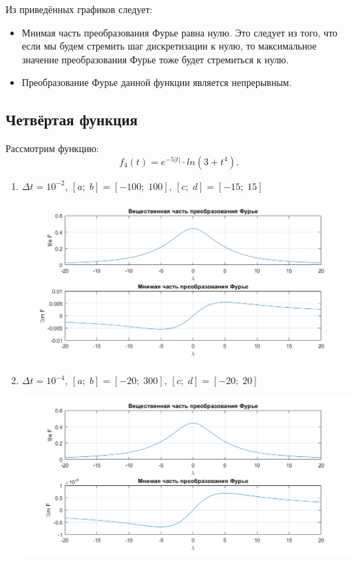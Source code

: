 \documentclass[a4paper, 11pt]{article}
\begin{document}
        Из приведённых графиков следует:
        \begin{itemize}
            \item
                Мнимая часть преобразования Фурье равна нулю. Это следует из того, что если мы будем стремить шаг дискретизации к нулю, то максимальное значение преобразования Фурье тоже будет стремиться к нулю.
            \item
                Преобразование Фурье данной функции является непрерывным.
        \end{itemize}
    \subsection{Четвёртая функция}
        Рассмотрим функцию:
        $$
            f_4(t)=e^{-5|t|} \cdot ln(3+t^4).        
        $$
        \begin{enumerate}
            \item
                $\Delta t = 10^{-2}$, $[a;\; b] = [-100;\; 100]$, $[c;\;d] = [-15;\;15]$
                
                \includegraphics[width=\linewidth]{img/9.png}
            \item
                $\Delta t = 10^{-4}$, $[a;\; b] = [-20;\; 300]$, $[c;\;d] = [-20;\;20]$
                
                \includegraphics[width=\linewidth]{img/10.png}
        \end{enumerate}
        
\end{document}
